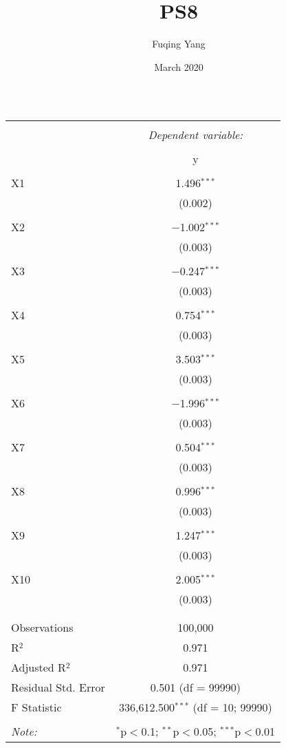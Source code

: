 \documentclass{article}
\title{PS8}
\author{Fuqing Yang}
\date{March 2020}
\begin{document}
\maketitle
\begin{table}[!htbp] \centering 
  \caption{} 
  \label{} 
\begin{tabular}{@{\extracolsep{5pt}}lc} 
\\[-1.8ex]\hline 
\hline \\[-1.8ex] 
 & \multicolumn{1}{c}{\textit{Dependent variable:}} \\ 
\cline{2-2} 
\\[-1.8ex] & y \\ 
\hline \\[-1.8ex] 
 X1 & 1.496$^{***}$ \\ 
  & (0.002) \\ 
  & \\ 
 X2 & $-$1.002$^{***}$ \\ 
  & (0.003) \\ 
  & \\ 
 X3 & $-$0.247$^{***}$ \\ 
  & (0.003) \\ 
  & \\ 
 X4 & 0.754$^{***}$ \\ 
  & (0.003) \\ 
  & \\ 
 X5 & 3.503$^{***}$ \\ 
  & (0.003) \\ 
  & \\ 
 X6 & $-$1.996$^{***}$ \\ 
  & (0.003) \\ 
  & \\ 
 X7 & 0.504$^{***}$ \\ 
  & (0.003) \\ 
  & \\ 
 X8 & 0.996$^{***}$ \\ 
  & (0.003) \\ 
  & \\ 
 X9 & 1.247$^{***}$ \\ 
  & (0.003) \\ 
  & \\ 
 X10 & 2.005$^{***}$ \\ 
  & (0.003) \\ 
  & \\ 
\hline \\[-1.8ex] 
Observations & 100,000 \\ 
R$^{2}$ & 0.971 \\ 
Adjusted R$^{2}$ & 0.971 \\ 
Residual Std. Error & 0.501 (df = 99990) \\ 
F Statistic & 336,612.500$^{***}$ (df = 10; 99990) \\ 
\hline 
\hline \\[-1.8ex] 
\textit{Note:}  & \multicolumn{1}{r}{$^{*}$p$<$0.1; $^{**}$p$<$0.05; $^{***}$p$<$0.01} \\ 
\end{tabular} 
\end{table} 
\end{document}
